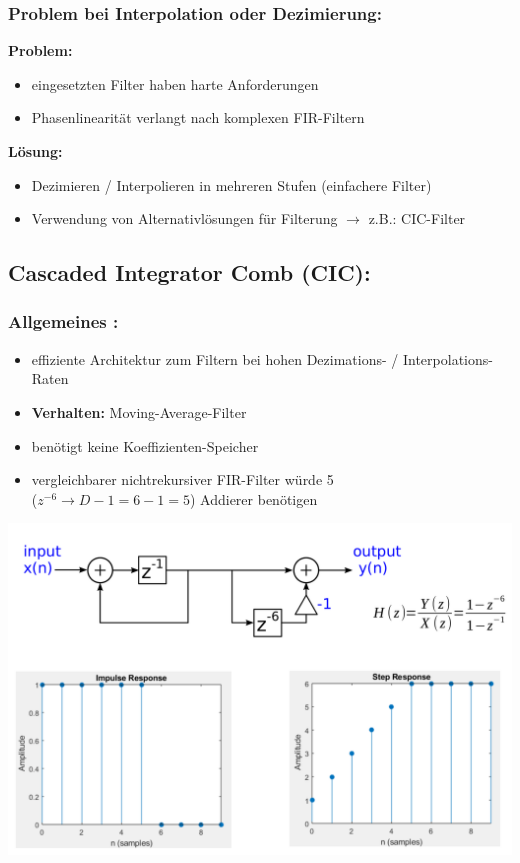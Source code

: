\documentclass[10pt,a4paper]{article}
\begin{document}
\subsubsection{Problem bei Interpolation oder Dezimierung: } 
\textbf{Problem:}
\begin{itemize}
  \item eingesetzten Filter haben harte Anforderungen
  \item Phasenlinearität verlangt nach komplexen FIR-Filtern
\end{itemize}

\textbf{Lösung:}
\begin{itemize}
  \item Dezimieren / Interpolieren in mehreren Stufen (einfachere Filter)
  \item Verwendung von Alternativlösungen für Filterung $\rightarrow$ z.B.: CIC-Filter
\end{itemize}

\subsection{Cascaded Integrator Comb (CIC):}
\subsubsection{Allgemeines :}
\begin{itemize}
  \item effiziente Architektur zum Filtern bei hohen Dezimations- / Interpolations-Raten
  \item \textbf{Verhalten: } Moving-Average-Filter
  \item benötigt keine Koeffizienten-Speicher
  \item vergleichbarer nichtrekursiver FIR-Filter würde 5 \\ ($z^{-6} \rightarrow D-1=6-1=5$) Addierer benötigen  
\end{itemize}

\begin{center}
  \includegraphics[width=.5\textwidth]{./img/Multirate_CIC.png}
\end{center}
\end{document}
